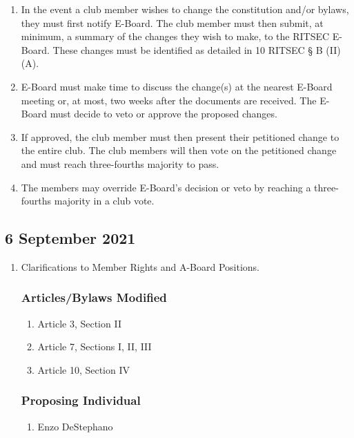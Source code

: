 
\begin{enumerate}
      \item In the event a club member wishes to change the constitution and/or bylaws,
            they must first notify E-Board. The club member must then submit, at minimum, a
            summary of the changes they wish to make, to the RITSEC E-Board. These changes
            must be identified as detailed in 10 RITSEC § B (II) (A).
      \item E-Board must make time to discuss the change(s) at the nearest E-Board meeting
            or, at most, two weeks after the documents are received. The E-Board must
            decide to veto or approve the proposed changes.
      \item If approved, the club member must then present their petitioned change to the
            entire club. The club members will then vote on the petitioned change and must
            reach three-fourths majority to pass.
      \item The members may override E-Board's decision or veto by reaching a three-fourths
            majority in a club vote.
\end{enumerate}

\subsection{6 September 2021}
\begin{enumerate}
      \item Clarifications to Member Rights and A-Board Positions.

            \subsubsection{Articles/Bylaws Modified}
            \begin{enumerate}
                  \item Article 3, Section II
                  \item Article 7, Sections I, II, III
                  \item Article 10, Section IV
            \end{enumerate}

            \subsubsection{Proposing Individual}
            \begin{enumerate}
                  \item Enzo DeStephano
            \end{enumerate}
\end{enumerate}
